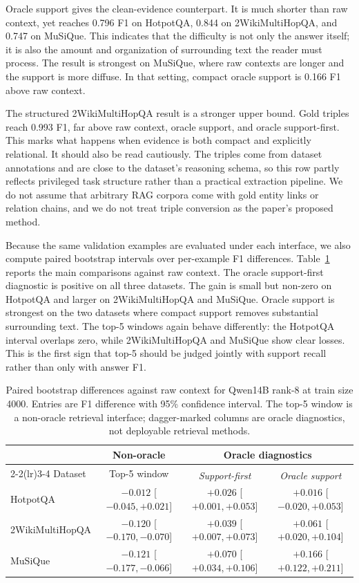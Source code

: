 \documentclass[a4paper,fleqn]{cas-sc}
\newcommand{\diagiface}[1]{\emph{#1}\textsuperscript{\dag}}
\begin{document}
Oracle support gives the clean-evidence counterpart. It is much shorter than
raw context, yet reaches 0.796 F1 on HotpotQA, 0.844 on 2WikiMultiHopQA, and
0.747 on MuSiQue. This indicates that the difficulty is not only the answer
itself; it is also the amount and organization of surrounding text the reader
must process. The result is strongest on MuSiQue, where raw contexts are longer
and the support is more diffuse. In that setting, compact oracle support is
0.166 F1 above raw context.

The structured 2WikiMultiHopQA result is a stronger upper bound. Gold triples
reach 0.993 F1, far above raw context, oracle support, and oracle
support-first. This marks what happens when evidence is both compact and
explicitly relational. It should also be read cautiously. The triples come from
dataset annotations and are close to the dataset's reasoning schema, so this
row partly reflects privileged task structure rather than a practical
extraction pipeline. We do not assume that arbitrary RAG corpora come with gold
entity links or relation chains, and we do not treat triple conversion as the
paper's proposed method.

Because the same validation examples are evaluated under each interface, we
also compute paired bootstrap intervals over per-example F1 differences.
Table~\ref{tab:qwen14b-paired-bootstrap} reports the main comparisons against
raw context. The oracle support-first diagnostic is positive on all three datasets.
The gain is small but non-zero on HotpotQA and larger on 2WikiMultiHopQA and
MuSiQue. Oracle support is strongest on the two datasets where compact support
removes substantial surrounding text. The top-5 windows again behave
differently: the HotpotQA interval overlaps zero, while 2WikiMultiHopQA and
MuSiQue show clear losses. This is the first sign that top-5 should be judged
jointly with support recall rather than only with answer F1.

\begin{table}[t]
\centering
\caption{Paired bootstrap differences against raw context for Qwen14B rank-8
at train size 4000. Entries are F1 difference with 95\% confidence interval.
The top-5 window is a non-oracle retrieval interface; dagger-marked columns are
oracle diagnostics, not deployable retrieval methods.}
\label{tab:qwen14b-paired-bootstrap}
\footnotesize
\setlength{\tabcolsep}{3pt}
\begin{tabular}{lccc}
\toprule
& Non-oracle & \multicolumn{2}{c}{Oracle diagnostics} \\
\cmidrule(lr){2-2}\cmidrule(lr){3-4}
Dataset & Top-5 window & \diagiface{Support-first} & \diagiface{Oracle support} \\
\midrule
HotpotQA & $-0.012$ [$-0.045,+0.021$] & $+0.026$ [$+0.001,+0.053$] & $+0.016$ [$-0.020,+0.053$] \\
2WikiMultiHopQA & $-0.120$ [$-0.170,-0.070$] & $+0.039$ [$+0.007,+0.073$] & $+0.061$ [$+0.020,+0.104$] \\
MuSiQue & $-0.121$ [$-0.177,-0.066$] & $+0.070$ [$+0.034,+0.106$] & $+0.166$ [$+0.122,+0.211$] \\
\bottomrule
\end{tabular}
\end{table}
\end{document}
